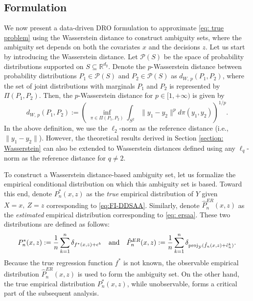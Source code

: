 \documentclass[onefignum,onetabnum]{siamart251216}
\begin{document}
\subsection{Formulation}
\label{sec:formulation}
We now present a data-driven DRO formulation to approximate \eqref{eq: true problem} using the Wasserstein distance to construct ambiguity sets, where the ambiguity set depends on both the covariates $x$ and the decisions $z$. Let us start by introducing the Wasserstein distance.  Let $\mathcal{P}(S)$ be the space of probability distributions supported on $S \subseteq \mathbb{R}^{d_y}$. 
Denote the $p$-Wasserstein distance between probability distributions $P_1\in \mathcal{P}(S)$ and $P_2 \in \mathcal{P}(S)$ as $d_{W,\,p}(P_1,P_2)$, where the set of joint distributions with marginals $P_1$ and $P_2$ is represented by $\Pi(P_1,P_2)$. Then, the $p$-Wasserstein distance for $p \in [1,+\infty)$ is given by 
\[
d_{W,\, p}(P_1,P_2):=
        \left(\; \inf_{\pi \in \Pi(P_1,P_2)} \int_{S^2} \|y_1 - y_2\|^p d\pi(y_1,y_2)\right)^{1/p}.
\]
In the above definition, we use the $\ell_2$-norm as the reference distance (i.e., $\|y_1 - y_2\|$). However, the theoretical results derived in Section \ref{section: Wasserstein} can also be extended to Wasserstein distances defined using any $\ell_q$-norm  as the reference distance for $q \neq 2$. 

To construct a Wasserstein distance-based ambiguity set, let us formalize the empirical conditional distribution on which this ambiguity set is based. Toward this end, denote $P_n^*(x,z)$ as the {\it true} empirical distribution of $Y$ given $X=x,\ Z=z$ corresponding to \eqref{eq:FI-DDSAA}. Similarly, denote $\hat{P}_n^{ER}(x,z)$ as the {\it estimated} empirical distribution corresponding to \eqref{eq: ersaa}. These two distributions are defined as follows:
\begin{align*}
P_n^*(x,z):=\frac{1}{n} \sum_{k=1}^n \delta_{f^*(x,z)+\epsilon^k}\ \ \ \text{and}\ \ \ \hat{P}_n^{ER}(x,z):= \frac{1}{n} \sum_{k=1}^n \delta_{{\rm{proj}}_\mathcal{Y}(\hat{f}_n(x,z)+\hat{\epsilon}_n^k)}.
\end{align*}
Because the true regression function $f^*$ is not known, the observable empirical distribution $\hat{P}_n^{ER}(x,z)$ is used to form the ambiguity set. On the other hand, the true empirical distribution $P_n^*(x,z)$, while unobservable, forms a critical part of the subsequent analysis. 
\end{document}
